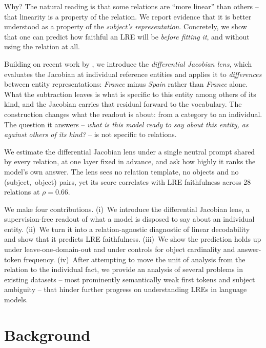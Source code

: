 \documentclass[11pt]{article}
\begin{document}
Why? The natural reading is that some relations are ``more linear'' than
others -- that linearity is a property of the relation. We report evidence
that it is better understood as a property of the \emph{subject's
representation}. Concretely, we show that one can predict how faithful an
LRE will be \emph{before fitting it}, and without using the relation at
all.

Building on recent work by \citep{gurnee2026workspace},
we  introduce the \emph{differential Jacobian lens}, which
evaluates the Jacobian at individual reference entities and applies it to
\emph{differences} between entity representations:
\emph{France} minus \emph{Spain} rather than \emph{France} alone. What
the subtraction leaves is what is specific to this entity among others
of its kind, and the Jacobian carries that residual forward to the
vocabulary. The construction changes what the readout is
about: from a category to an individual. The question it
answers -- \emph{what is this model ready to say about this entity, as
against others of its kind?} -- is not specific to relations.

We estimate  the differential Jacobian lens under a single
neutral prompt shared by every relation, at one layer fixed in advance,
and ask how highly it ranks the model's own answer. The lens sees no
relation template, no objects and no (subject,~object) pairs, yet its
score correlates with LRE faithfulness across 28 relations at
$\rho = 0.66$.

We make four contributions. (i)~We introduce the differential Jacobian
lens, a supervision-free readout of what a model is disposed to say about
an individual entity. (ii)~We turn it into a relation-agnostic diagnostic
of linear decodability and show that it predicts LRE faithfulness.
(iii)~We show the prediction holds up
under leave-one-domain-out and under controls for object
cardinality and answer-token frequency.
(iv)~After attempting to 
move 
the unit of
analysis from the relation to the individual fact,
we provide an analysis of several
problems in existing datasets -- most prominently
semantically
weak first tokens
and subject ambiguity --
that hinder further
progress on understanding LREs in language models. 


\section{Background}
\end{document}
